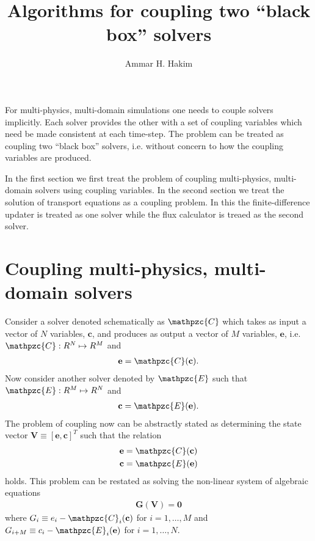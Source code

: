\documentclass[11pt]{article}
\title{Algorithms for coupling two ``black box'' solvers}
\author{Ammar H. Hakim}
\date{}
\newcommand{\mvec}[1]{\mathbf{#1}}
\newcommand{\script}[1]{\mathpzc{#1}}
\begin{document}
\maketitle

For multi-physics, multi-domain simulations one needs to couple
solvers implicitly. Each solver provides the other with a set of
coupling variables which need be made consistent at each
time-step. The problem can be treated as coupling two ``black box''
solvers, i.e. without concern to how the coupling variables are
produced.

In the first section we first treat the problem of coupling
multi-physics, multi-domain solvers using coupling variables. In the
second section we treat the solution of transport equations as a
coupling problem. In this the finite-difference updater is treated as
one solver while the flux calculator is treaed as the second solver.

\section{Coupling multi-physics, multi-domain solvers}

Consider a solver denoted schematically as $\script{C}$ which takes as
input a vector of $N$ variables, $\mvec{c}$, and produces as output a
vector of $M$ variables, $\mvec{e}$, i.e. $\script{C} : R^{N} \mapsto
R^{M}$ and
\begin{align}
  \mvec{e} = \script{C}(\mvec{c}).
\end{align}
Now consider another solver denoted by $\script{E}$ such that
$\script{E} : R^{M} \mapsto R^{N}$ and
\begin{align}
  \mvec{c} = \script{E}(\mvec{e}).
\end{align}
The problem of coupling now can be abstractly stated as determining
the state vector $\mvec{V} \equiv [\mvec{e}, \mvec{c}]^T$ such that
the relation
\begin{align}
  \mvec{e} &= \script{C}(\mvec{c}) \\
  \mvec{c} &= \script{E}(\mvec{e})
\end{align}
holds. This problem can be restated as solving the non-linear system
of algebraic equations 
\begin{align}
  \mvec{G}(\mvec{V}) = \mvec{0}
\end{align}
where $G_i \equiv e_i - \script{C}_i(\mvec{c})$ for $i=1,\ldots,M$ and
$G_{i+M} \equiv c_i - \script{E}_i(\mvec{e})$ for $i=1,\ldots,N$.
\end{document}
